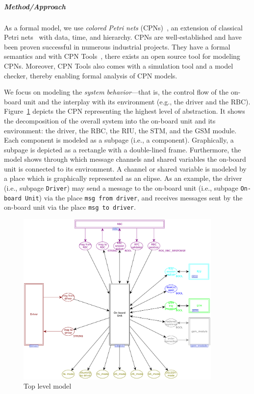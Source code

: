 \subparagraph{Method/Approach}

As a formal model, we use \textit{colored Petri nets} (CPNs)~\cite{CPN-book}, an extension of classical Petri nets~\cite{PNbook} with data, time, and hierarchy. CPNs are well-established and have been proven successful in numerous industrial projects. They have a formal semantics and with CPN Tools~\cite{Westergaard2013apn}, there exists an open source tool for modeling CPNs. Moreover, CPN Tools also comes with a simulation tool and a model checker, thereby enabling formal analysis of CPN models. 

We focus on modeling the \textit{system behavior}---that is, the control flow of the on-board unit and the interplay with its environment (e.g., the driver and the RBC). Figure~\ref{fig:Top} depicts the CPN representing the highest level of abstraction. It shows the decomposition of the overall system into the on-board unit and its environment: the driver, the RBC, the RIU, the STM, and the GSM module. Each component is modeled as a subpage (i.e., a component). Graphically, a subpage is depicted as a rectangle with a double-lined frame. Furthermore, the model shows through which message channels and shared variables the on-board unit is connected to its environment. A channel or shared variable is modeled by a place which is graphically represented as an elipse. As an example, the driver (i.e., subpage \texttt{Driver}) may send a message to the on-board unit (i.e., subpage \texttt{On-board Unit}) via the place \texttt{msg from driver}, and receives messages sent by the on-board unit via the place \texttt{msg to driver}.

\begin{figure}[tb]
	\centering
		\includegraphics[width=0.9\textwidth]{figures/Top.pdf}
	\caption{Top level model}
	\label{fig:Top}
\end{figure}

